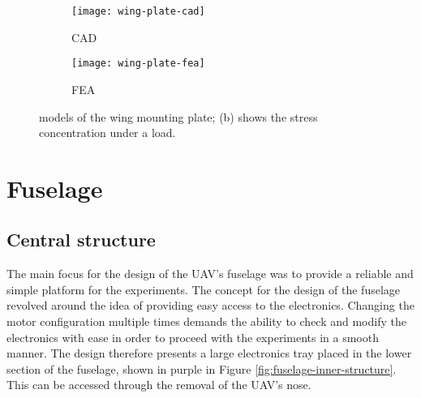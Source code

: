 \documentclass[../../main.tex]{subfiles}
\begin{document}

\begin{figure}[H]

    \centering
    \begin{subfigure}[b]{0.49\columnwidth}
        \centering
        \texttt{[image: wing-plate-cad]}
        \caption{CAD}
        \label{fig:wing-plate:cad}
    \end{subfigure}
    \hfill
    \begin{subfigure}[b]{0.49\columnwidth}
        \centering
        \texttt{[image: wing-plate-fea]}
        \caption{FEA}
        \label{fig:wing-plate:fea}
    \end{subfigure}
    
    \caption{
        models of the wing mounting plate; (b) shows the stress concentration under a  load.
    }
    \label{fig:wing-plate}
\end{figure}

\section{Fuselage} \label{sec:final-design-proposal:fuselage}

\subsection{Central structure} \label{sec:final-design-proposal:fuselage:central-structure}

The main focus for the design of the UAV's fuselage was to provide a reliable and simple platform for the experiments.
The concept for the design of the fuselage revolved around the idea of providing easy access to the electronics.
Changing the motor configuration multiple times demands the ability to check and modify the electronics with ease in order to proceed with the experiments in a smooth manner.
The design therefore presents a large electronics tray placed in the lower section of the fuselage, shown in purple in Figure \ref{fig:fuselage-inner-structure}.
This can be accessed through the removal of the UAV's nose.

\end{document}
